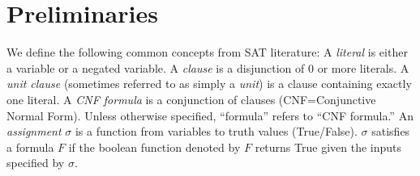 \documentclass[conference]{IEEEtran}
\begin{document}



\section{Preliminaries}

We define the following common concepts from SAT literature:
A \emph{literal} is either a variable or a negated variable.
A \emph{clause} is a disjunction of 0 or more literals.
A \emph{unit clause} (sometimes referred to as simply a \emph{unit}) is a clause containing exactly one literal.
A \emph{CNF formula} is a conjunction of clauses (CNF=Conjunctive Normal Form). Unless otherwise specified, ``formula'' refers to ``CNF formula.''
An \emph{assignment} $\sigma$ is a function from variables to truth values (True/False). $\sigma$ satisfies a formula $F$ if the boolean function denoted by $F$ returns True given the inputs specified by $\sigma$.
\end{document}
